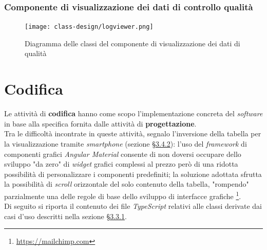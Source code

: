 \subsubsection*{Componente di visualizzazione dei dati di controllo qualità}
\begin{figure}[H]
    \centering
    \texttt{[image: class-design/logviewer.png]}
    \caption{Diagramma delle classi del componente di visualizzazione dei dati di qualità}
\end{figure}

\section{Codifica}
Le attività di \textbf{codifica} hanno come scopo l'implementazione concreta del \textit{software} in base alla specifica fornita dalle attività di \textbf{progettazione}. \\
Tra le difficoltà incontrate in queste attività, segnalo l'inversione della tabella per la visualizzazione tramite \textit{smartphone} (sezione \hyperref[subsubsec:mobile]{§3.4.2}): l'uso del \textit{framework} di componenti grafici \textit{Angular Material} consente di non doversi occupare
dello sviluppo "da zero" di \textit{widget} grafici complessi al prezzo però di una ridotta possibilità di personalizzare i componenti predefiniti; la soluzione adottata sfrutta la possibilità di \textit{scroll} orizzontale del solo contenuto della tabella,
"rompendo" parzialmente una delle regole di base dello sviluppo di interfacce grafiche \footnote{\href{https://mailchimp.com/resources/horizontal-scrolling/}{https://mailchimp.com}}. \\
Di seguito si riporta il contenuto dei file \textit{TypeScript} relativi alle classi derivate dai casi d'uso descritti nella sezione \hyperref[subsubsec:casi-d'uso]{§3.3.1}.

